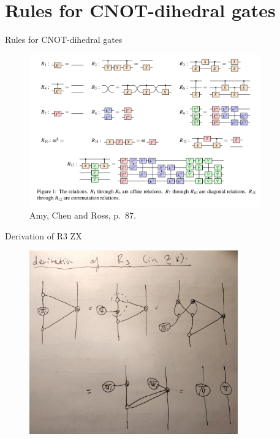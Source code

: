 \documentclass{beamer}
\theoremstyle{definition}
\begin{document}
\section{Rules for CNOT-dihedral gates}

\begin{frame}{Rules for CNOT-dihedral gates}

\begin{figure}
\includegraphics[width=10cm]{relations}
\centering
\caption{Amy, Chen and Ross, p.~87.}
\end{figure}
\end{frame}

\begin{frame}{Derivation of R3 ZX}

\begin{figure}
\includegraphics[width=9cm]{R3}
\centering
\end{figure}
\end{frame}
\end{document}

